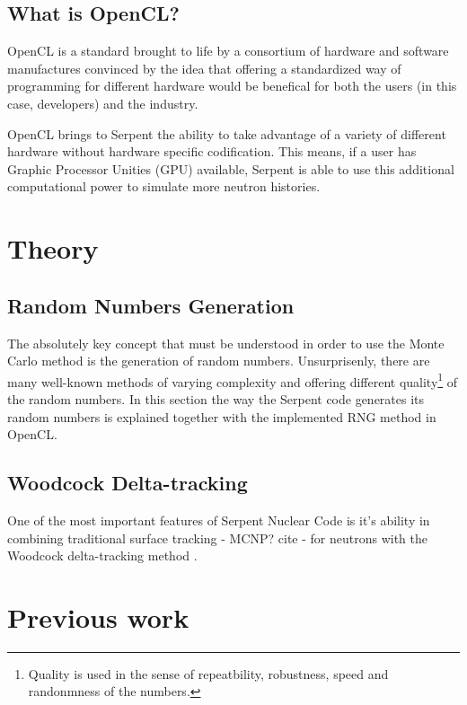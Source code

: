 \documentclass[twoside,a4paper,12pt,english,draft]{anstrans}
\begin{document}
\subsection{What is OpenCL?}

OpenCL\cite{opencl} is a standard brought to life by a consortium of hardware and software
manufactures convinced by the idea that offering a standardized way of programming for different
hardware would be benefical for both the users (in this case, developers) and the industry.

OpenCL brings to Serpent the ability to take advantage of a variety of different hardware
without hardware specific codification. This means, if a user has Graphic Processor Unities (GPU)
available, Serpent is able to use this additional computational power to simulate
more neutron histories.

\section{Theory}

\subsection{Random Numbers Generation}
The absolutely key concept that must be understood in order to use the Monte Carlo method is
the generation of random numbers. Unsurprisenly, there are many well-known methods of varying
complexity and offering different quality\footnote{Quality is used in the sense of
  repeatbility, robustness, speed and randonmness of the numbers.} of the random numbers.
In this section the way the Serpent code generates its random numbers is explained together
with the implemented RNG method in OpenCL.


\subsection{Woodcock Delta-tracking}

One of the most important features of Serpent Nuclear Code is it's ability in combining
traditional surface tracking - MCNP? cite - for neutrons with the Woodcock delta-tracking method \cite{Woodcock1965}.

\section{Previous work}
\end{document}
